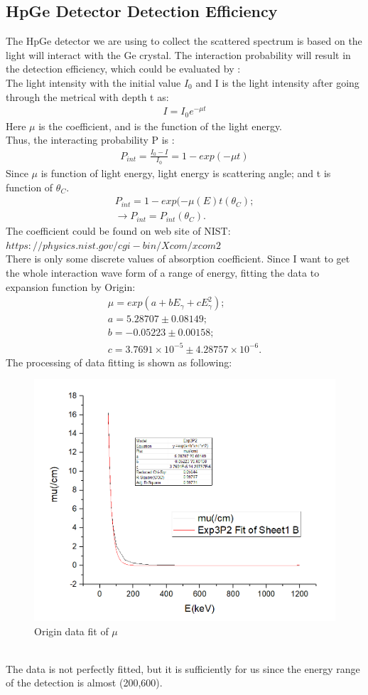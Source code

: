 \documentclass[12pt]{article}
\begin{document}
	\subsection{HpGe Detector Detection Efficiency}
	The HpGe detector we are using to collect the scattered spectrum is based on the light will interact with the Ge crystal.  The interaction probability will result in the detection efficiency, which could be evaluated by :\\
	The light intensity with the initial value $I_0$ and I is the light intensity after going through the metrical with depth t as:
	\begin{gather}
	I=I_0e^{-\mu t}
	\end{gather}
	Here $\mu$ is the coefficient, and is the function of the light energy.\\
	Thus, the interacting probability P is :
	\begin{gather}
	P_{int}=\frac{I_0-I}{I_0}=1-exp(-\mu t)
	\end{gather}
	Since $\mu$ is function of light energy, light energy is scattering angle; and t is function of $\theta_C$.
	\begin{gather}
		P_{int}=1-exp(-\mu(E) t(\theta_C);\\
		\to P_{int}=P_{int}(\theta_C).
	\end{gather} 
	The coefficient could be  found on web site of NIST:\\$https://physics.nist.gov/cgi-bin/Xcom/xcom2 $\\
	There is only some  discrete values of absorption coefficient. Since I want to get the whole interaction wave form of a range of energy, fitting the data to expansion function by Origin:
	\begin{gather}
		\mu=exp(a+bE_\gamma+cE_\gamma^2);\\
		a=5.28707\pm 0.08149;\\
		b=-0.05223\pm 0.00158;\\
		c=3.7691\times 10^{-5}\pm 4.28757\times 10^{-6}.
	\end{gather}
	The processing of data fitting is shown as following:
	\begin{figure}[h]
		\centering
		\includegraphics[width=0.7\linewidth,height=0.2\textheight]{pic/fit_mu}
		\caption{Origin data fit of $\mu$ }
		\label{fig:fitmu}
	\end{figure}\\
	The data is not perfectly fitted, but it is sufficiently for us since the energy range of the detection is almost (200,600).
	
\end{document}
